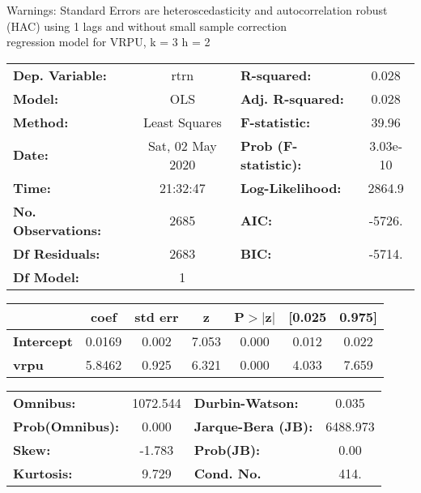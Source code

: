 Warnings: \newline
 [1] Standard Errors are heteroscedasticity and autocorrelation robust (HAC) using 1 lags and without small sample correction\\ 

regression model for VRPU, k = 3 h = 2\begin{center}
\begin{tabular}{lclc}
\toprule
\textbf{Dep. Variable:}    &       rtrn       & \textbf{  R-squared:         } &     0.028   \\
\textbf{Model:}            &       OLS        & \textbf{  Adj. R-squared:    } &     0.028   \\
\textbf{Method:}           &  Least Squares   & \textbf{  F-statistic:       } &     39.96   \\
\textbf{Date:}             & Sat, 02 May 2020 & \textbf{  Prob (F-statistic):} &  3.03e-10   \\
\textbf{Time:}             &     21:32:47     & \textbf{  Log-Likelihood:    } &    2864.9   \\
\textbf{No. Observations:} &        2685      & \textbf{  AIC:               } &    -5726.   \\
\textbf{Df Residuals:}     &        2683      & \textbf{  BIC:               } &    -5714.   \\
\textbf{Df Model:}         &           1      & \textbf{                     } &             \\
\bottomrule
\end{tabular}
\begin{tabular}{lcccccc}
                   & \textbf{coef} & \textbf{std err} & \textbf{z} & \textbf{P$> |$z$|$} & \textbf{[0.025} & \textbf{0.975]}  \\
\midrule
\textbf{Intercept} &       0.0169  &        0.002     &     7.053  &         0.000        &        0.012    &        0.022     \\
\textbf{vrpu}      &       5.8462  &        0.925     &     6.321  &         0.000        &        4.033    &        7.659     \\
\bottomrule
\end{tabular}
\begin{tabular}{lclc}
\textbf{Omnibus:}       & 1072.544 & \textbf{  Durbin-Watson:     } &    0.035  \\
\textbf{Prob(Omnibus):} &   0.000  & \textbf{  Jarque-Bera (JB):  } & 6488.973  \\
\textbf{Skew:}          &  -1.783  & \textbf{  Prob(JB):          } &     0.00  \\
\textbf{Kurtosis:}      &   9.729  & \textbf{  Cond. No.          } &     414.  \\
\bottomrule
\end{tabular}
\end{center}

